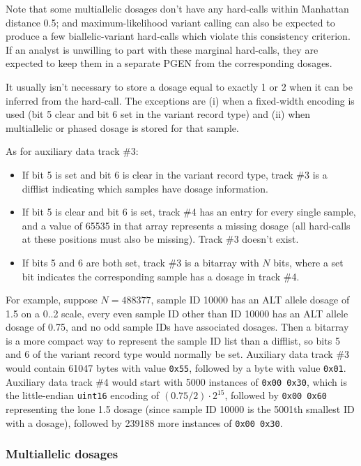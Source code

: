 \documentclass[8pt]{article}
\begin{document}
Note that some multiallelic dosages don't have any hard-calls within Manhattan
distance 0.5; and maximum-likelihood variant calling can also be expected to
produce a few biallelic-variant hard-calls which violate this consistency
criterion.  If an analyst is unwilling to part with these marginal hard-calls,
they are expected to keep them in a separate PGEN from the corresponding
dosages.

It usually isn't necessary to store a dosage equal to exactly 1 or 2 when it
can be inferred from the hard-call.  The exceptions are (i) when a fixed-width
encoding is used (bit 5 clear and bit 6 set in the variant record type) and
(ii) when multiallelic or phased dosage is stored for that sample.

As for auxiliary data track \#3:

\begin{itemize}
\item If bit 5 is set and bit 6 is clear in the variant record type, track \#3
  is a difflist indicating which samples have dosage information.
\item If bit 5 is clear and bit 6 is set, track \#4 has an entry for every
  single sample, and a value of 65535 in that array represents a missing
  dosage (all hard-calls at these positions must also be missing).  Track \#3
  doesn't exist.
\item If bits 5 and 6 are both set, track \#3 is a bitarray with $N$ bits,
  where a set bit indicates the corresponding sample has a dosage in track \#4.
\end{itemize}

For example, suppose $N=488377$, sample ID 10000 has an ALT allele dosage of
1.5 on a 0..2 scale, every even sample ID other than ID 10000 has an ALT allele
dosage of 0.75, and no odd sample IDs have associated dosages.  Then a bitarray
is a more compact way to represent the sample ID list than a difflist, so bits
5 and 6 of the variant record type would normally be set.  Auxiliary data track
\#3 would contain 61047 bytes with value \texttt{0x55}, followed by a byte with
value \texttt{0x01}.  Auxiliary data track \#4 would start with 5000 instances
of \texttt{0x00 0x30}, which is the little-endian \texttt{uint16} encoding of
$(0.75/2)\cdot 2^{15}$, followed by \texttt{0x00 0x60} representing the lone
1.5 dosage (since sample ID 10000 is the 5001th smallest ID with a dosage),
followed by 239188 more instances of \texttt{0x00 0x30}.

\subsubsection{Multiallelic dosages}
\end{document}
